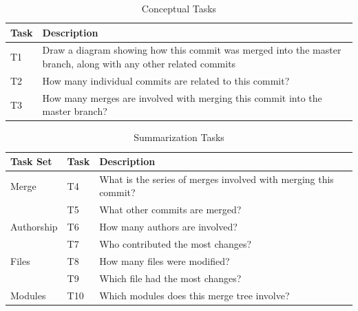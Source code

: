 

\begin{table}[htpb]
  \centering
  \caption{Conceptual Tasks }
  \label{tab:conceptual_tasks}
  \begin{tabulary}{0.9\textwidth}{LL}
    \toprule
    Task & Description\\
    \midrule
    T1 & Draw a diagram showing how this commit was merged into the master branch, along with any other related commits\\
    T2 & How many individual commits are related to this commit?\\
    T3 & How many merges are involved with merging this commit into the master branch?\\
    \bottomrule
  \end{tabulary}
\end{table}

\begin{table}[htpb]
  \centering
  \caption{Summarization Tasks}
  \label{tab:summarization_tasks}
  \begin{tabulary}{\linewidth}{LLL}
    \toprule
    Task Set   & Task & Description\\\midrule
    Merge      & T4   & What is the series of merges involved with merging this
    commit?\\
    & T5   & What other commits are merged?\\
    Authorship & T6   & How many authors are involved?\\
    & T7   & Who contributed the most changes?\\
    Files      & T8   & How many files were modified?\\
    & T9   & Which file had the most changes?\\
    Modules    & T10  & Which modules does this merge tree involve?\\
    \bottomrule
  \end{tabulary}
\end{table}


